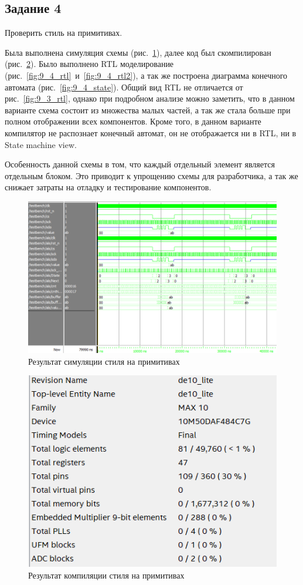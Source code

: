 \documentclass[a4paper,14pt]{article}
\begin{document}
	\subsection{Задание 4}
	
	Проверить стиль на примитивах.
	
	Была выполнена симуляция схемы (рис.~\ref{fig:9_4_wave}), далее код был скомпилирован (рис.~\ref{fig:9_4_compilation}).
	Было выполнено RTL моделирование (рис.~\ref{fig:9_4_rtl}~и~\ref{fig:9_4_rtl2}), а так же построена диаграмма конечного автомата (рис.~\ref{fig:9_4_state}).
	Общий вид RTL не отличается от рис.~\ref{fig:9_3_rtl}, однако при подробном анализе можно заметить, что в данном варианте схема состоит из множества малых частей, а так же стала больше при полном отображении всех компонентов.
	Кроме того, в данном варианте компилятор не распознает конечный автомат, он не отображается ни в RTL, ни в State machine view.
	
	Особенность данной схемы в том, что каждый отдельный элемент является отдельным блоком.
	Это приводит к упрощению схемы для разработчика, а так же снижает затраты на отладку и тестирование компонентов. 
	
	\begin{figure}[H]
		\centering
		\includegraphics[width=0.9\linewidth]{images/9_4_wave}
		\caption{Результат симуляции стиля на примитивах}
		\label{fig:9_4_wave}
	\end{figure}
	
	\begin{figure}[H]
		\centering
		\includegraphics[width=0.5\linewidth]{images/9_4_compilation}
		\caption{Результат компиляции стиля на примитивах}
		\label{fig:9_4_compilation}
	\end{figure}
	
\end{document}
